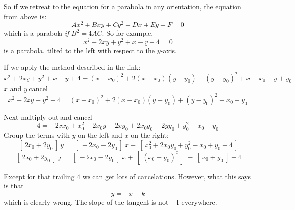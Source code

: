 \documentclass[11pt, oneside]{article}
\begin{document}
So if we retreat to the equation for a parabola in any orientation, the equation from above is:
\[ Ax^2 + Bxy + Cy^2 + Dx + Ey + F = 0 \]
which is a parabola \emph{if} $B^2 = 4AC$.  So for example, 
\[ x^2 + 2xy + y^2 + x - y + 4 = 0 \]
is a parabola, tilted to the left with respect to the $y$-axis.

If we apply the method described in the link:
\[ x^2 + 2xy + y^2 + x - y + 4 = (x-x_0)^2 + 2(x-x_0)(y - y_0) + (y-y_0)^2 + x - x_0 - y + y_0 \]
$x$ and $y$ cancel
\[ x^2 + 2xy + y^2 + 4 = (x-x_0)^2 + 2(x-x_0)(y - y_0) + (y-y_0)^2 - x_0 + y_0 \]

Next multiply out and cancel
\[ 4 =  -2x x_0 + x_0^2 - 2x_0y  - 2xy_0 + 2x_0 y_0 - 2yy_0 + y_0^2 - x_0 + y_0 \]
Group the terms with $y$ on the left and $x$ on the right:
\[ \ [ \ 2x_0 + 2y_0 \ ] \ y =  \ [ \ -2 x_0 - 2y_0 \ ] \ x + \ [ \ x_0^2  + 2x_0 y_0 + y_0^2 - x_0 + y_0 - 4 \ ] \]
\[ \ [ \ 2x_0 + 2y_0 \ ] \ y =  \ [ \ -2 x_0 - 2y_0 \ ] \ x + \ [ \ (x_0 + y_0)^2 \ ] \ - \ [ \ x_0 + y_0 \ ]  - 4 \]

Except for that trailing $4$ we can get lots of cancelations.  However, what this says is that
\[ y = -x + k \]
which is clearly wrong.  The slope of the tangent is not $-1$ everywhere.
\end{document}
